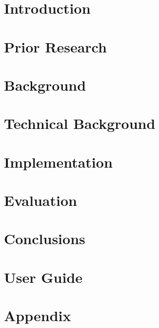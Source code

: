 



\listoftodos



\pagebreak

\chapter{Introduction}


\chapter{Prior Research}


\chapter{Background}


\chapter{Technical Background}


\chapter{Implementation}


\chapter{Evaluation}


\chapter{Conclusions}


\chapter{User Guide}


\printbibliography

\appendix
\chapter{Appendix}



